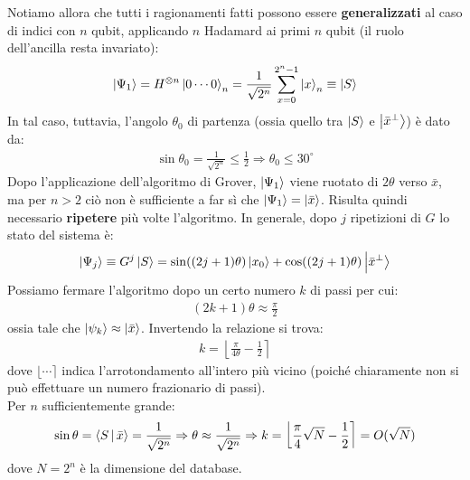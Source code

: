 \documentclass[../../InformazioneQuantistica.tex]{subfiles}
\begin{document}
Notiamo allora che tutti i ragionamenti fatti possono essere \textbf{generalizzati} al caso di indici con $n$ qubit, applicando $n$ Hadamard ai primi $n$ qubit (il ruolo dell'ancilla resta invariato):
\begin{align*}
    \Ket{\Psi_1} = H^{\otimes n} \Ket{0\cdots 0}_n = \frac{1}{\sqrt{2^n}} \sum_{x=0}^{2^n-1} \Ket{x}_n \equiv \Ket{S}
\end{align*}
In tal caso, tuttavia, l'angolo $\theta_0$ di partenza (ossia quello tra $\Ket{S}$ e $\Ket{\bar{x}^\perp}$) è dato da:
\begin{align*}
    \sin\theta_0 = \frac{1}{\sqrt{2^n}} \leq \frac{1}{2} \Rightarrow \theta_0 \leq 30^\circ
\end{align*}
Dopo l'applicazione dell'algoritmo di Grover, $\Ket{\Psi_1}$ viene ruotato di $2\theta$ verso $\bar{x}$, ma per $n>2$ ciò non è sufficiente a far sì che $\Ket{\Psi_1} = \Ket{\bar{x}}$. Risulta quindi necessario \textbf{ripetere} più volte l'algoritmo. In generale, dopo $j$ ripetizioni di $G$ lo stato del sistema è:
\begin{align}
    \Ket{\Psi_j} \equiv G^j \Ket{S} = \sin((2j+1)\theta)\Ket{x_0} + \cos((2j+1)\theta)\Ket{\bar{x}^\perp}
    \label{eqn:Gj}
\end{align}
Possiamo fermare l'algoritmo dopo un certo numero $k$ di passi per cui:
\begin{align*}
    (2k+1)\theta \approx \frac{\pi}{2}
\end{align*}
ossia tale che $\Ket{\psi_k} \approx \Ket{\bar{x}}$. Invertendo la relazione si trova:
\begin{align*}
    k = \left \lfloor \frac{\pi}{4\theta} - \frac{1}{2} \right \rceil 
\end{align*}
dove $\lfloor \cdots \rceil$ indica l'arrotondamento all'intero più vicino (poiché chiaramente non si può effettuare un numero frazionario di passi).\\
Per $n$ sufficientemente grande:
\begin{align*}
    \sin \theta = \Braket{S|\bar{x}} = \frac{1}{\sqrt{2^n}} \Rightarrow \theta \approx \frac{1}{\sqrt{2^n}} \Rightarrow k=\left \lfloor \frac{\pi}{4} \sqrt{N} - \frac{1}{2} \right \rceil = O(\sqrt{N})
\end{align*}
dove $N=2^n$ è la dimensione del database.\\
\end{document}

